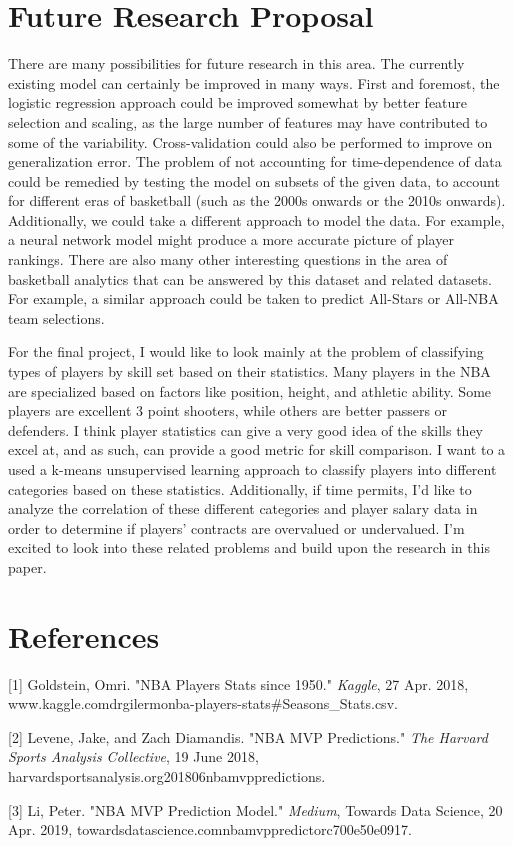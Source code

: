 \documentclass{article}
\begin{document}
\section{\Large Future Research Proposal}

There are many possibilities for future research in this area. The currently existing model can certainly be improved in many ways. First and foremost, the logistic regression approach could be improved somewhat by better feature selection and scaling, as the large number of features may have contributed to some of the variability. Cross-validation could also be performed to improve on generalization error. The problem of not accounting for time-dependence of data could be remedied by testing the model on subsets of the given data, to account for different eras of basketball (such as the 2000s onwards or the 2010s onwards). Additionally, we could take a different approach to model the data. For example, a neural network model might produce a more accurate picture of player rankings. There are also many other interesting questions in the area of basketball analytics that can be answered by this dataset and related datasets. For example, a similar approach could be taken to predict All-Stars or All-NBA team selections. 

For the final project, I would like to look mainly at the problem of classifying types of players by skill set based on their statistics. Many players in the NBA are specialized based on factors like position, height, and athletic ability. Some players are excellent 3 point shooters, while others are better passers or defenders. I think player statistics can give a very good idea of the skills they excel at, and as such, can provide a good metric for skill comparison. I want to a used a k-means unsupervised learning approach to classify players into different categories based on these statistics. Additionally, if time permits, I'd like to analyze the correlation of these different categories and player salary data in order to determine if players' contracts are overvalued or undervalued. I'm excited to look into these related problems and build upon the research in this paper.

\section*{References}


[1] Goldstein, Omri. "NBA Players Stats since 1950." {\it Kaggle}, 27 Apr. 2018, www.kaggle.com\/drgilermo\/nba-players-stats\#Seasons\_Stats.csv.

[2] Levene, Jake, and Zach Diamandis. "NBA MVP Predictions." {\it The Harvard Sports Analysis Collective}, 19 June 2018, harvardsportsanalysis.org\/2018\/06\/nba\-mvp\-predictions\/.

[3] Li, Peter. "NBA MVP Prediction Model." {\it Medium}, Towards Data Science, 20 Apr. 2019, towardsdatascience.com\/nba\-mvp\-predictor\-c700e50e0917.
\end{document}
